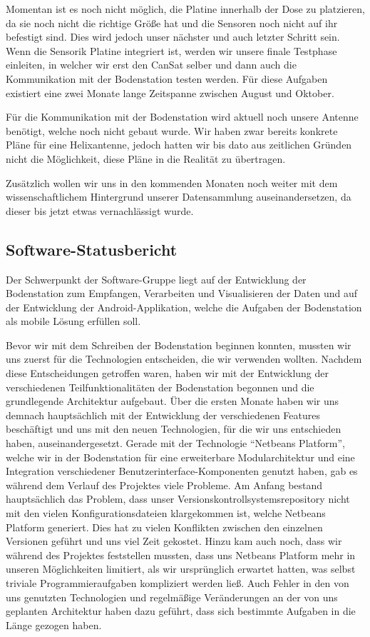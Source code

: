 Momentan ist es noch nicht möglich, die Platine innerhalb der Dose zu platzieren, da sie noch nicht die richtige Größe hat und die Sensoren noch nicht auf ihr befestigt sind. Dies wird jedoch unser nächster und auch letzter Schritt sein. Wenn die Sensorik Platine integriert ist, werden wir unsere finale Testphase einleiten, in welcher wir erst den CanSat selber und dann auch die Kommunikation mit der Bodenstation testen werden. Für diese Aufgaben existiert eine zwei Monate lange Zeitspanne zwischen August und Oktober.

Für die Kommunikation mit der Bodenstation wird aktuell noch unsere Antenne benötigt, welche noch nicht gebaut wurde. Wir haben zwar bereits konkrete Pläne für eine Helixantenne, jedoch hatten wir bis dato aus zeitlichen Gründen nicht die Möglichkeit, diese Pläne in die Realität zu übertragen.

Zusätzlich wollen wir uns in den kommenden Monaten noch weiter mit dem wissenschaftlichem Hintergrund unserer Datensammlung auseinandersetzen, da dieser bis jetzt etwas vernachlässigt wurde.

\subsection{Software-Statusbericht}
Der Schwerpunkt der Software-Gruppe liegt auf der Entwicklung der Bodenstation zum Empfangen, Verarbeiten und Visualisieren der Daten und auf der Entwicklung der Android-Applikation, welche die Aufgaben der Bodenstation als mobile Lösung erfüllen soll.

Bevor wir mit dem Schreiben der Bodenstation beginnen konnten, mussten wir uns zuerst für die Technologien entscheiden, die wir verwenden wollten. Nachdem diese Entscheidungen getroffen waren, haben wir mit der Entwicklung der verschiedenen Teilfunktionalitäten der Bodenstation begonnen und die grundlegende Architektur aufgebaut. Über die ersten Monate haben wir uns demnach hauptsächlich mit der Entwicklung der verschiedenen Features beschäftigt und uns mit den neuen Technologien, für die wir uns entschieden haben, auseinandergesetzt. Gerade mit der Technologie ``Netbeans Platform'', welche wir in der Bodenstation für eine erweiterbare Modularchitektur und eine Integration verschiedener Benutzerinterface-Komponenten genutzt haben, gab es während dem Verlauf des Projektes viele Probleme. Am Anfang bestand hauptsächlich das Problem, dass unser Versionskontrollsystemsrepository nicht mit den vielen Konfigurationsdateien klargekommen ist, welche Netbeans Platform generiert. Dies hat zu vielen Konflikten zwischen den einzelnen Versionen geführt und uns viel Zeit gekostet. Hinzu kam auch noch, dass wir während des Projektes feststellen mussten, dass uns Netbeans Platform mehr in unseren Möglichkeiten limitiert, als wir ursprünglich erwartet hatten, was selbst triviale Programmieraufgaben kompliziert werden ließ. Auch Fehler in den von uns genutzten Technologien und regelmäßige Veränderungen an der von uns geplanten Architektur haben dazu geführt, dass sich bestimmte Aufgaben in die Länge gezogen haben.

